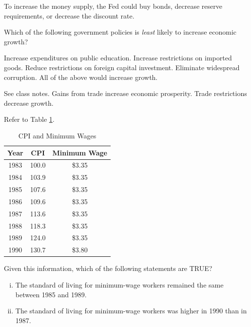 \documentclass[addpoints,11pt]{exam}
\theoremstyle{definition}
\begin{document}
\begin{questions}
	\begin{solution} 
		To increase the money supply, the Fed could buy bonds, decrease reserve requirements, or decrease the discount rate.
	\end{solution}


	
	\question Which of the following government policies is \textit{least} likely to increase economic growth?
	
	\begin{choices}
		\choice Increase expenditures on public education.
		\CorrectChoice Increase restrictions on imported goods.
		\choice Reduce restrictions on foreign capital investment.
		\choice Eliminate widespread corruption.
		\choice All of the above would increase growth.
	\end{choices} 
	
	\begin{solution}
		 See class notes. Gains from trade increase economic prosperity. Trade restrictions decrease growth.
	\end{solution}


	
	\question Refer to Table \ref{tab2}. 
	
	\begin{table}[H]
		\centering
		\caption{CPI and Minimum Wages}
		\label{tab2}
		\begin{tabular}{c|c|c}        
			
			Year & CPI & Minimum Wage \\
			\hline
			1983 & 100.0 & \$3.35 \\
			1984 & 103.9 & \$3.35 \\
			1985 & 107.6 & \$3.35 \\
			1986 & 109.6 & \$3.35 \\
			1987 & 113.6 & \$3.35 \\
			1988 & 118.3 & \$3.35 \\
			1989 & 124.0 & \$3.35 \\
			1990 & 130.7 & \$3.80 \\
		\end{tabular}
	\end{table}
	
	Given this information, which of the following statements are TRUE?
	
	\begin{enumerate}[(i)]
		\item The standard of living for minimum-wage workers remained the same between 1985 and 1989.
		\item The standard of living for minimum-wage workers was higher in 1990 than in 1987.
	\end{enumerate}
	

\end{questions}
\end{document}
